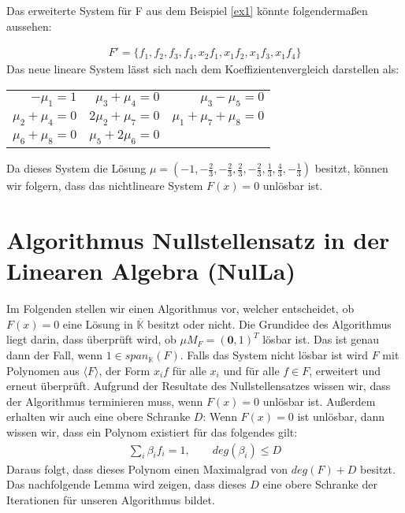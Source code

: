 \begin{example}
Das erweiterte System für F aus dem Beispiel \ref{ex1} könnte folgendermaßen aussehen:

\begin{align*}
F'=\{f_1,f_2,f_3,f_4,x_2f_1,x_1f_2,x_1f_3,x_1f_4\}
\end{align*}
Das neue lineare System lässt sich nach dem Koeffizientenvergleich darstellen als:


\begin{table}[h]%
\begin{center}
\begin{tabular}{rrr}
$-\mu_1=1$ & $\mu_3+\mu_4=0$ & $\mu_3-\mu_5=0$ \\
$\mu_2+\mu_4=0$ & $2\mu_2+\mu_7=0$ & $\mu_1+\mu_7+\mu_8=0$ \\
$\mu_6 + \mu_8 = 0$ & $\mu_5+2\mu_6 = 0$
\end{tabular}
\label{}
\end{center}
\end{table}

\noindent Da dieses System die Lösung $\mu = (-1,-\frac{2}{3},-\frac{2}{3},\frac{2}{3},-\frac{2}{3},\frac{1}{3},\frac{4}{3},-\frac{1}{3})$ besitzt, können wir folgern, dass das nichtlineare System $F(x) = 0$ unlösbar ist.
\end{example}

\section{Algorithmus Nullstellensatz in der Linearen Algebra (NulLa)}

Im Folgenden stellen wir einen Algorithmus vor, welcher entscheidet, ob $F(x) = 0$ eine Lösung in $\overline{\mathbb{K}}$ besitzt oder nicht. Die Grundidee des Algorithmus liegt darin, dass überprüft wird, ob $\mu M_F = (\textbf{0},1)^T$ lösbar ist. Das ist genau dann der Fall, wenn $1 \in span_\mathbb{K}(F)$. Falls das System nicht lösbar ist wird $F$ mit Polynomen aus $\langle F \rangle$, der Form $x_if$ für alle $x_i$ und für alle $f \in F$, erweitert und erneut überprüft. Aufgrund der Resultate des Nullstellensatzes wissen wir, dass der Algorithmus terminieren muss, wenn $F(x) = 0$ unlösbar ist. Außerdem erhalten wir auch eine obere Schranke $D$: Wenn $F(x) = 0$ ist unlösbar, dann wissen wir, dass ein Polynom existiert für das folgendes gilt: 
\begin{align*}
\sum_i \beta_i f_i = 1, \qquad deg(\beta_i)\le D
\end{align*}
Daraus folgt, dass dieses Polynom einen Maximalgrad von $deg(F)+D$ besitzt. \\
Das nachfolgende Lemma wird zeigen, dass dieses $D$ eine obere Schranke der Iterationen für unseren Algorithmus bildet.

